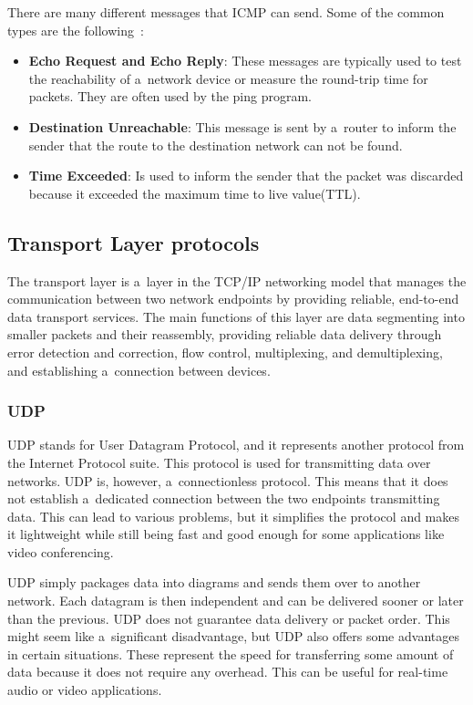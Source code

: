 \documentclass[
  printed,     %
  color,       %
  oneside,     %
  nosansbold,  %
  nocolorbold, %
  nolof,         %
  nolot,         %
]{fithesis4}
\begin{document}
There are many different messages that ICMP can send. Some of the common types are the following~\cite{10.5555/2584507}:

\begin{itemize}[noitemsep,topsep=0pt]
    \item \textbf{Echo Request and Echo Reply}: These messages are typically used to test the reachability of a~network device or measure the round-trip time for packets. They are often used by the ping program.
    \item \textbf{Destination Unreachable}: This message is sent by a~router to inform the sender that the route to the destination network can not be found.
    \item \textbf{Time Exceeded}: Is used to inform the sender that the packet was discarded because it exceeded the maximum time to live value(TTL).
\end{itemize}

\subsection{Transport Layer protocols}

The transport layer is a~layer in the TCP/IP networking model that manages the communication between two network endpoints by providing reliable, end-to-end data transport services. The main functions of this layer are data segmenting into smaller packets and their reassembly, providing reliable data delivery through error detection and correction, flow control, multiplexing, and demultiplexing, and establishing a~connection between devices.

\subsubsection{UDP}

UDP stands for User Datagram Protocol, and it represents another protocol from the Internet Protocol suite. This protocol is used for transmitting data over networks. UDP is, however, a~connectionless protocol. This means that it does not establish a~dedicated connection between the two endpoints transmitting data. This can lead to various problems, but it simplifies the protocol and makes it lightweight while still being fast and good enough for some applications like video conferencing.

UDP simply packages data into diagrams and sends them over to another network. Each datagram is then independent and can be delivered sooner or later than the previous. UDP does not guarantee data delivery or packet order. This might seem like a~significant disadvantage, but UDP also offers some advantages in certain situations. These represent the speed for transferring some amount of data because it does not require any overhead. This can be useful for real-time audio or video applications.
\end{document}

